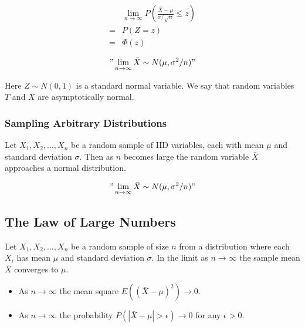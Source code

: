 \begin{align*}
      & \lim_{n\to\infty} P\left(\frac{\bar{X}-\mu}{\sigma/\sqrt{n}}\leq z\right) \\
    = & P(Z=z)                                                                    \\
    = & \Phi(z)
\end{align*}

$$"\lim_{n\to\infty}\bar{X}\sim N(\mu,\sigma^2/n)"$$

Here $Z\sim N(0,1)$ is a standard normal variable. We say that random  variables $T$ and $\bar{X}$ are asymptotically normal.

\subsubsection{Sampling Arbitrary Distributions}

Let $X_1, X_2, \ldots, X_n$ be a random sample of IID variables, each with mean $\mu$ and standard deviation $\sigma$.
Then as $n$ becomes large the random variable $\bar{X}$ approaches a normal distribution.

$$"\lim_{n\to\infty}\bar{X}\sim N(\mu,\sigma^2/n)"$$

\subsection{The Law of Large Numbers}

Let $X_1,X_2,\ldots,X_n$ be a random sample of size $n$ from a distribution where each $X_i$ has mean $\mu$ and standard deviation $\sigma$.
In the limit as $n\to \infty$ the sample mean $\bar{X}$ converges to $\mu$.

\begin{itemize}
    \item As $n\to\infty$ the mean square $E((\bar{X}-\mu)^2)\to 0$.
    \item As $n\to\infty$ the probability $P(|\bar{X}-\mu|>\epsilon)\to 0$ for any $\epsilon>0$.
\end{itemize}


